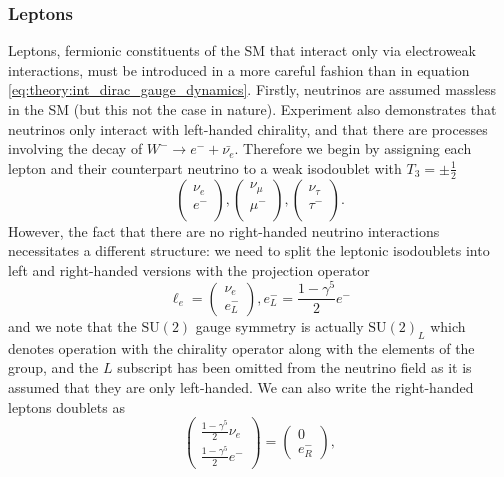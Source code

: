 \subsubsection{Leptons}
Leptons, fermionic constituents of the SM that interact only via electroweak interactions, must be introduced in a more careful fashion than in equation \ref{eq:theory:int_dirac_gauge_dynamics}. 
Firstly, neutrinos are assumed massless in the SM (but this not the case in nature).
Experiment also demonstrates that neutrinos only interact with left-handed chirality, and that there are processes involving the decay of $W^{-}\rightarrow{}e^{-}+\bar{\nu_{e}}$. Therefore we begin by assigning each lepton and their counterpart neutrino to a weak isodoublet with $T_{3} = \pm\frac{1}{2}$ 
\begin{equation}
    \label{eq:theory:lepton_isodoublets}
    \begin{pmatrix}
        \nu_{e} \\
        e^{-} \\
    \end{pmatrix},
    \begin{pmatrix}
        \nu_{\mu} \\
        \mu^{-} \\
    \end{pmatrix},
    \begin{pmatrix}
        \nu_{\tau} \\
        \tau^{-} \\
    \end{pmatrix}.
\end{equation}
However, the fact that there are no right-handed neutrino interactions necessitates a different structure: we need to split the leptonic isodoublets into left and right-handed versions with the projection operator
\begin{equation}
    \ell_{e} =\begin{pmatrix}
        \nu_{e} \\
        e_{L}^{-}
    \end{pmatrix},
    e^{-}_{L} = \frac{1-\gamma^{5}}{2}e^{-}
\end{equation}
and we note that the $\mathrm{SU}(2)$ gauge symmetry is actually $\mathrm{SU}(2)_{L}$ which denotes operation with the chirality operator along with the elements of the group, and the $L$ subscript has been omitted from the neutrino field as it is assumed that they are only left-handed. 
We can also write the right-handed leptons doublets as
\begin{equation}
    \label{eq:theory:right_handed_leptons}
    \begin{pmatrix}
        \frac{1-\gamma^{5}}{2}\nu_{e} \\
        \frac{1-\gamma^{5}}{2}e^{-}
    \end{pmatrix}=\begin{pmatrix}
        0 \\
        e_{R}^{-}
    \end{pmatrix},
\end{equation}
